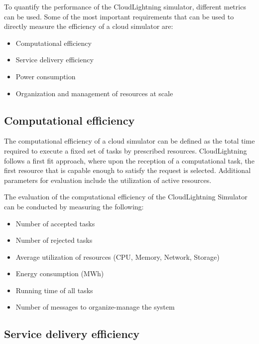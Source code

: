 To quantify the performance of the CloudLightning simulator, different metrics can be used. Some of the most important requirements that can be used to directly measure the efficiency of a cloud simulator are:

\begin{itemize}
\item Computational efficiency
\item Service delivery efficiency
\item Power consumption
\item Organization and management of resources at scale
\end{itemize}

\subsection{Computational efficiency}

The computational efficiency of a cloud simulator can be defined as the total time required to execute a fixed set of tasks by prescribed resources. CloudLightning follows a first fit approach, where upon the reception of a computational task, the first resource that is capable enough to satisfy the request is selected. Additional parameters for evaluation include the utilization of active resources.

The evaluation of the computational efficiency of the CloudLightning Simulator can be conducted by measuring the following:

\begin{itemize}
\item Number of accepted tasks
\item Number of rejected tasks
\item Average utilization of resources (CPU, Memory, Network, Storage)
\item Energy consumption (MWh)
\item Running time of all tasks
\item Number of messages to organize-manage the system
\end{itemize}


\subsection{Service delivery efficiency}

